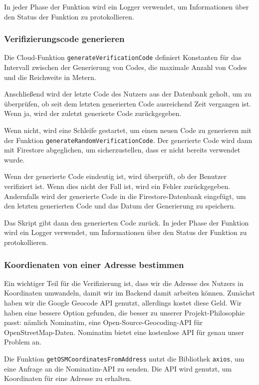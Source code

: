 In jeder Phase der Funktion wird ein Logger verwendet, um Informationen über den Status der Funktion zu protokollieren.

\subsubsection{Verifizierungscode generieren}
Die Cloud-Funktion \texttt{generateVerificationCode} definiert Konstanten für das Intervall zwischen der Generierung von Codes, die maximale Anzahl von Codes und die Reichweite in Metern.

Anschließend wird der letzte Code des Nutzers aus der Datenbank geholt, um zu überprüfen, ob seit dem letzten generierten Code ausreichend Zeit vergangen ist. Wenn ja, wird der zuletzt generierte Code zurückgegeben.

Wenn nicht, wird eine Schleife gestartet, um einen neuen Code zu generieren mit der Funktion \texttt{generateRandomVerificationCode}. Der generierte Code wird dann mit Firestore abgeglichen, um sicherzustellen, dass er nicht bereits verwendet wurde.

Wenn der generierte Code eindeutig ist, wird überprüft, ob der Benutzer verifiziert ist. Wenn dies nicht der Fall ist, wird ein Fehler zurückgegeben. Andernfalls wird der generierte Code in die Firestore-Datenbank eingefügt, um den letzten generierten Code und das Datum der Generierung zu speichern.

Das Skript gibt dann den generierten Code zurück. In jeder Phase der Funktion wird ein Logger verwendet, um Informationen über den Status der Funktion zu protokollieren.

\subsubsection{Koordienaten von einer Adresse bestimmen}
Ein wichtiger Teil für die Verifizierung ist, dass wir die Adresse des Nutzers in Koordinaten umwandeln, damit wir im Backend damit arbeiten können. Zunächst haben wir die Google Geocode API genutzt, allerdings kostet diese Geld. Wir haben eine bessere Option gefunden, die besser zu unserer Projekt-Philosophie passt: nämlich Nominatim, eine Open-Source-Geocoding-API für OpenStreetMap-Daten. Nominatim bietet eine kostenlose API für genau unser Problem an.

Die Funktion \texttt{getOSMCoordinatesFromAddress} nutzt die Bibliothek \texttt{axios}, um eine Anfrage an die Nominatim-API zu senden. Die API wird genutzt, um Koordinaten für eine Adresse zu erhalten.

